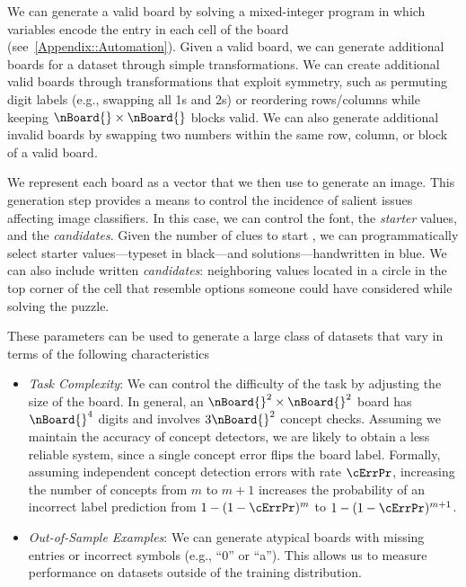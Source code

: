 \documentclass[11pt]{article}
\begin{document}
We can generate a valid board by solving a mixed-integer program in which variables encode the entry in each cell of the board (see~\cref{Appendix::Automation}). Given a valid board, we can generate additional boards for a dataset through simple transformations. We can create additional valid boards through transformations that exploit symmetry, such as permuting digit labels (e.g., swapping all 1s and 2s) or reordering rows/columns while keeping $\nBoard{} \times \nBoard{}$ blocks valid. %
We can also generate additional invalid boards by swapping two numbers within the same row, column, or block of a valid board.


We represent each board as a vector that we then use to generate an image. This generation step provides a means to control the incidence of salient issues affecting image classifiers. In this case, we can control the font, the \emph{starter} values, and the \emph{candidates}. Given the number of clues to start \citep[$\geq 17$][]{mcguire2013cluesudoku}, we can programmatically select starter values---typeset in black---and solutions---handwritten in blue. We can also include written \emph{candidates}: neighboring values located in a circle in the top corner of the cell that resemble options someone could have considered while solving the puzzle.


These parameters can be used to generate a large class of datasets that vary in terms of the following characteristics %
%
\begin{itemize}[leftmargin=0pt,label={}]



\item \emph{Task Complexity}: 
We can control the difficulty of the task by adjusting the size of the board. 
%
In general, an $\nBoard{}^2 \times \nBoard{}^2$ board has $\nBoard{}^4$ digits and involves $3\nBoard{}^2$ concept checks.
%
Assuming we maintain the accuracy of concept detectors, we are likely to obtain a less reliable system, since a single concept error flips the board label. 
%
Formally, assuming independent concept detection errors with rate $\cErrPr$, increasing the number of concepts from $m$ to $m+1$ increases the probability of an incorrect label prediction from $1 - (1-\cErrPr)^m$ to $1 - (1-\cErrPr)^{m+1}$.


\item \emph{Out-of-Sample Examples}: 
%
We can generate atypical boards with missing entries or incorrect symbols (e.g., ``0'' or ``a''). This allows us to measure performance on datasets outside of the training distribution.

\end{itemize}
\end{document}
